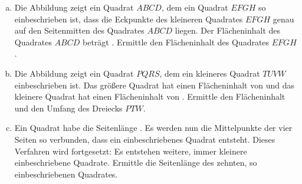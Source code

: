 \begin{exercise}
\begin{enumerate}[a)]
      \item Die Abbildung zeigt ein Quadrat $ABCD$, dem ein Quadrat $EFGH$ so
            einbeschrieben ist, dass die Eckpunkte des kleineren Quadrates $EFGH$
            genau auf den Seitenmitten des Quadrates $ABCD$ liegen. Der Flächeninhalt
            des Quadrates $ABCD$ beträgt . Ermittle den Flächeninhalt des
            Quadrates $EFGH$.
      \item Die Abbildung zeigt ein Quadrat $PQRS$, dem ein kleineres Quadrat $TUVW$
            einbeschrieben ist. Das größere Quadrat hat einen Flächeninhalt von
             und das kleinere Quadrat hat einen Flächeninhalt von .
            Ermittle den Flächeninhalt und den Umfang des Dreiecks $PTW$.
      \item Ein Quadrat habe die Seitenlänge . Es werden nun die Mittelpunkte
            der vier Seiten so verbunden, dass ein einbeschriebenes Quadrat entsteht.
            Dieses Verfahren wird fortgesetzt: Es entstehen weitere, immer kleinere
            einbeschriebene Quadrate. Ermittle die Seitenlänge des zehnten, so
            einbeschriebenen Quadrates.
    \end{enumerate}
  \fi
\end{exercise}
